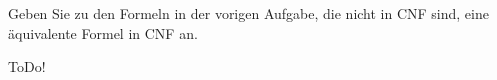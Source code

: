 
\begin{exercise}[31]

Geben Sie zu den Formeln in der vorigen Aufgabe, die nicht in CNF sind, eine äquivalente Formel in CNF an.

\end{exercise}


\begin{solution}

ToDo!

\end{solution}

